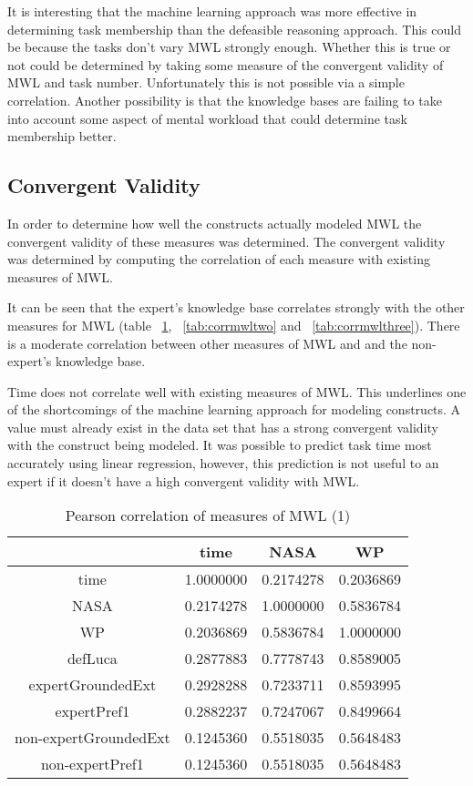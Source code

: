 It is interesting that the machine learning approach was more effective in determining task membership than the defeasible reasoning approach. This could be because the tasks don't vary MWL strongly enough. Whether this is true or not could be determined by taking some measure of the convergent validity of MWL and task number. Unfortunately this is not possible via a simple correlation. Another possibility is that the knowledge bases are failing to take into account some aspect of mental workload that could determine task membership better.

\subsection{Convergent Validity}

In order to determine how well the constructs actually modeled MWL the convergent validity of these measures was determined. The convergent validity was determined by computing the correlation of each measure with existing measures of MWL. 

It can be seen that the expert's knowledge base correlates strongly with the other measures for MWL (table ~\ref{tab:corrmwlone}, ~\ref{tab:corrmwltwo} and ~\ref{tab:corrmwlthree}). There is a moderate correlation between other measures of MWL and and the non-expert's knowledge base. 

Time does not correlate well with existing measures of MWL. This underlines one of the shortcomings of the machine learning approach for modeling constructs. A value must already exist in the data set that has a strong convergent validity with the construct being modeled. It was possible to predict task time most accurately using linear regression, however, this prediction is not useful to an expert if it doesn't have a high convergent validity with MWL. 

\begin{table}[]
\centering
\begin{tabular}{|c|c|c|c|}
                 &  time     & NASA      &  WP        \\ \hline
time             & 1.0000000 & 0.2174278 & 0.2036869  \\
NASA             & 0.2174278 & 1.0000000 & 0.5836784 \\
WP               & 0.2036869 & 0.5836784 & 1.0000000 \\
defLuca          & 0.2877883 & 0.7778743 & 0.8589005 \\
expertGroundedExt  & 0.2928288 & 0.7233711 & 0.8593995 \\
expertPref1        & 0.2882237 & 0.7247067 & 0.8499664 \\
non-expertGroundedExt & 0.1245360 & 0.5518035 & 0.5648483 \\
non-expertPref1       & 0.1245360 & 0.5518035 & 0.5648483 \\
\end{tabular}
\caption{Pearson correlation of measures of MWL (1)}
\label{tab:corrmwlone}
\end{table}

